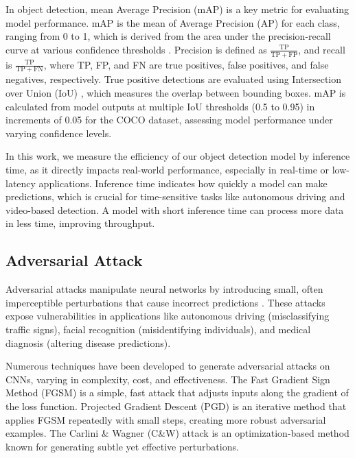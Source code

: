 \documentclass[10pt]{cai}
\begin{document}
In object detection, mean Average Precision (mAP) is a key metric for evaluating model performance. mAP is the mean of Average Precision (AP) for each class, ranging from 0 to 1, which is derived from the area under the precision-recall curve at various confidence thresholds \cite{map}. Precision is defined as $\frac{\mathrm{TP}}{\mathrm{TP} + \mathrm{FP}}$, and recall is $\frac{\mathrm{TP}}{\mathrm{TP} + \mathrm{FN}}$, where TP, FP, and FN are true positives, false positives, and false negatives, respectively. True positive detections are evaluated using Intersection over Union (IoU) \cite{iou}, which measures the overlap between bounding boxes. mAP is calculated from model outputs at multiple IoU thresholds (0.5 to 0.95) in increments of 0.05 for the COCO dataset, assessing model performance under varying confidence levels. 

In this work, we measure the efficiency of our object detection model by inference time, as it directly impacts real-world performance, especially in real-time or low-latency applications. Inference time indicates how quickly a model can make predictions, which is crucial for time-sensitive tasks like autonomous driving and video-based detection. A model with short inference time can process more data in less time, improving throughput.

\subsection{Adversarial Attack}
Adversarial attacks manipulate neural networks by introducing small, often imperceptible perturbations that cause incorrect predictions \cite{Li_2022}. These attacks expose vulnerabilities in applications like autonomous driving (misclassifying traffic signs), facial recognition (misidentifying individuals), and medical diagnosis (altering disease predictions).

Numerous techniques have been developed to generate adversarial attacks on CNNs, varying in complexity, cost, and effectiveness. The Fast Gradient Sign Method (FGSM) \cite{goodfellow2015explainingharnessingadversarialexamples} is a simple, fast attack that adjusts inputs along the gradient of the loss function. Projected Gradient Descent (PGD) \cite{madry2019deeplearningmodelsresistant} is an iterative method that applies FGSM repeatedly with small steps, creating more robust adversarial examples. The Carlini \& Wagner (C\&W) \cite{carlini2017evaluatingrobustnessneuralnetworks} attack is an optimization-based method known for generating subtle yet effective perturbations.
\end{document}

